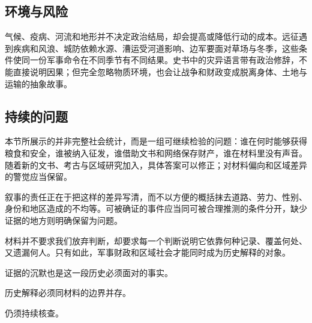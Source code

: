 \subsection{环境与风险}
气候、疫病、河流和地形并不决定政治结局，却会提高或降低行动的成本。远征遇到疾病和风浪、城防依赖水源、漕运受河道影响、边军要面对草场与冬季，这些条件使同一份军事命令在不同季节有不同结果。史书中的灾异语言带有政治修辞，不能直接说明因果；但完全忽略物质环境，也会让战争和财政变成脱离身体、土地与运输的抽象故事。

\subsection{持续的问题}
本节所展示的并非完整社会统计，而是一组可继续检验的问题：谁在何时能够获得粮食和安全，谁被纳入征发，谁借助文书和网络保存财产，谁在材料里没有声音。随着新的文书、考古与区域研究加入，具体答案可以修正；对材料偏向和区域差异的警觉应当保留。


\noindent 叙事的责任正在于把这样的差异写清，而不以方便的概括抹去道路、劳力、性别、身份和地区造成的不均等。可被确证的事件应当同可被合理推测的条件分开，缺少证据的地方则明确保留为问题。

材料并不要求我们放弃判断，却要求每一个判断说明它依靠何种记录、覆盖何处、又遗漏何人。只有如此，军事财政和区域社会才能同时成为历史解释的对象。

证据的沉默也是这一段历史必须面对的事实。

历史解释必须同材料的边界并存。

仍须持续核查。
